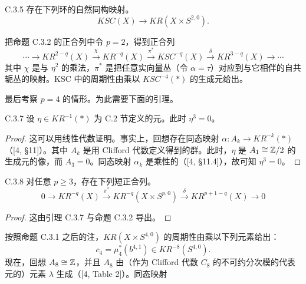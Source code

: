 
\begin{proposition*}{C.3.5}
  存在下列环的自然同构映射。
  \[
    KSC(X)\to KR(X\times S^{2,0}).
  \]
\end{proposition*}

把命题 C.3.2 的正合列中令 $p=2$，得到正合列
\begin{equation}
  \cdots\to KR^{2-q}(X)\xrightarrow{\chi} KR^{-q}(X)
  \xrightarrow{\pi^*} KSC^{-q}(X)\xrightarrow{\delta} KR^{3-q}(X)\to\cdots \tag{C.3.6}
\end{equation}
其中 $\chi$ 是与 $\eta^2$ 的乘法，$\pi^*$ 是把任意实向量丛（令 $\alpha=\tau$）对应到与它相伴的自共轭丛的映射。KSC 中的周期性由乘以 $KSC^{-4}(*)$ 的生成元给出。

最后考察 $p=4$ 的情形。为此需要下面的引理。

\begin{lemma*}{C.3.7}
  设 $\eta\in KR^{-1}(*)$ 为 C.2 节定义的元。此时 $\eta^3=0$。
\end{lemma*}

\begin{proof}
  这可以用线性代数证明。事实上，回想存在同态映射 $\alpha\colon A_k\to KR^{-k}(*)$（[4, §11]）。其中 $A_k$ 是用 Clifford 代数定义得到的群。此时，$\eta$ 是 $A_1\cong\mathbb{Z}/2$ 的生成元的像，而 $A_3=0$。同态映射 $\alpha_k$ 是乘性的（[4, §11.4]），故可知 $\eta^3=0$。
\end{proof}

\begin{corollary*}{C.3.8}
  对任意 $p\ge 3$，存在下列短正合列。
  \[
    0\to KR^{-q}(X)\xrightarrow{\pi^*} KR^{-q}(X\times S^{p,0})
    \xrightarrow{\delta} KR^{p+1-q}(X)\to 0
  \]
\end{corollary*}

\begin{proof}
  这由引理 C.3.7 与命题 C.3.2 导出。
\end{proof}

按照命题 C.3.1 之后的注，$KR(X\times S^{4,0})$ 的周期性由乘以下列元素给出：
\[
  c_4=\mu_4^*(b^{4,1})\in KR^{-8}(S^{4,0}).
\]
现在，回想 $A_8\cong\mathbb{Z}$，并且 $A_8$ 由（作为 Clifford 代数 $C_8$ 的不可约分次模的代表元的）元素 $\lambda$ 生成（[4, Table 2]）。同态映射

